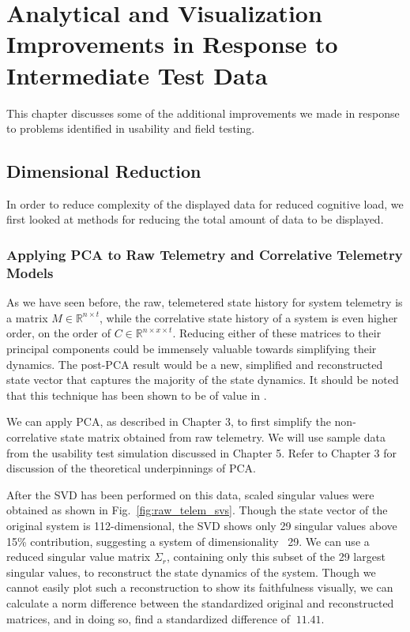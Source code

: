 
\chapter{Analytical and Visualization Improvements in Response to Intermediate Test Data}

This chapter discusses some of the additional improvements we made in response to problems identified in usability and field testing.

\section{Dimensional Reduction}

In order to reduce complexity of the displayed data for reduced cognitive load, we first looked at methods for reducing the total amount of data to be displayed.

\subsection{Applying PCA to Raw Telemetry and Correlative Telemetry Models}

As we have seen before, the raw, telemetered state history for system telemetry is a matrix $M \in \mathbb{R}^{n \times t}$, while the correlative state history of a system is even higher order, on the order of $C \in \mathbb{R}^{n \times x \times t}$. Reducing either of these matrices to their principal components could be immensely valuable towards simplifying their dynamics. The post-PCA result would be a new, simplified and reconstructed state vector that captures the majority of the state dynamics. It should be noted that this technique has been shown to be of value in \cite{villegas2010principal}.

We can apply PCA, as described in Chapter 3, to first simplify the non-correlative state matrix obtained from raw telemetry. We will use sample data from the usability test simulation discussed in Chapter 5. Refer to Chapter 3 for discussion of the theoretical underpinnings of PCA.

After the SVD has been performed on this data, scaled singular values were obtained as shown in Fig.~\ref{fig:raw_telem_svs}. Though the state vector of the original system is 112-dimensional, the SVD shows only 29 singular values above 15\% contribution, suggesting a system of dimensionality ~29. We can use a reduced singular value matrix $\Sigma_{r}$, containing only this subset of the 29 largest singular values, to reconstruct the state dynamics of the system. Though we cannot easily plot such a reconstruction to show its faithfulness visually, we can calculate a norm difference between the standardized original and reconstructed matrices, and in doing so, find a standardized difference of $~11.41$.

